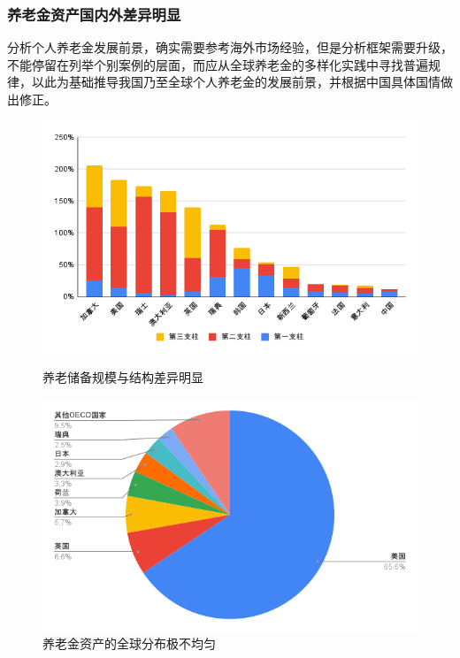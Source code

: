 \documentclass[a4paper,zihao=5]{ctexbeamer}
\begin{document}
\begin{frame}
    \frametitle{养老金资产国内外差异明显}
    分析个人养老金发展前景，确实需要参考海外市场经验，但是分析框架需要升级，不能停留在列举个别案例的层面，而应从全球养老金的多样化实践中寻找普遍规律，以此为基础推导我国乃至全球个人养老金的发展前景，并根据中国具体国情做出修正。
    \begin{figure}[H]
        \begin{minipage}{0.48\linewidth}
            \centering
            \includegraphics[width=\linewidth]{img/三支柱规模占GDP比重.png}
            \caption{养老储备规模与结构差异明显}
        \end{minipage}
        \begin{minipage}{0.48\linewidth}
            \centering
            \includegraphics[width=\linewidth]{img/totalOECDpensionassets.png}
            \caption{养老金资产的全球分布极不均匀}
        \end{minipage}
    \end{figure}
\end{frame}
\end{document}
